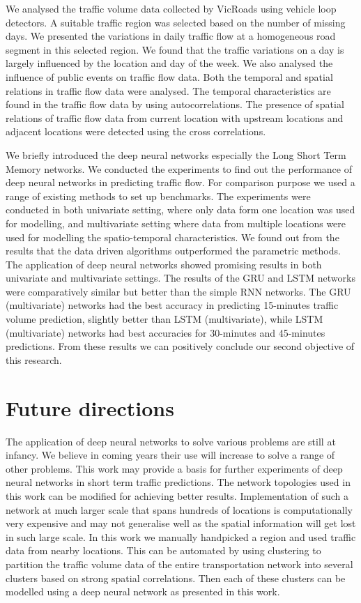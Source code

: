 We analysed the traffic volume data collected by VicRoads using vehicle loop detectors. A suitable
traffic region was selected based on the number of missing days. We presented the
variations in daily traffic flow at a homogeneous road segment in this selected region. We found
that the traffic variations on a day is largely influenced by the location and day of the week.
We also analysed the influence of public events on traffic flow data. Both the temporal and
spatial relations in traffic flow data were analysed. The temporal characteristics are found in the
traffic flow data by using autocorrelations. The presence of spatial relations of traffic flow
data from current location with upstream locations and adjacent locations were detected using the
cross correlations.

We briefly introduced the deep neural networks especially the Long Short Term Memory networks.
We conducted the experiments to find out the performance of deep neural networks in predicting traffic
flow. For comparison purpose we used a range of existing methods to set up benchmarks. The experiments
were conducted in both univariate setting, where only data form one location was used for modelling, and
multivariate setting where data from multiple locations were used for modelling the spatio-temporal
characteristics. We found out from the results that the data driven algorithms outperformed the parametric
methods. The application of deep neural networks showed promising results in both univariate and
multivariate settings. The results of the GRU and LSTM networks were comparatively similar but better
than the simple RNN networks. The GRU (multivariate) networks had the best accuracy in predicting 15-minutes traffic
volume prediction, slightly better than LSTM (multivariate), while LSTM (multivariate) networks had
best accuracies for 30-minutes and 45-minutes predictions. From these results we can positively
conclude our second objective of this research.

\section{Future directions}
The application of deep neural networks to solve various problems are still at infancy. We believe in
coming years their use will increase to solve a range of other problems. This work may provide a basis
for further experiments of deep neural networks in short term traffic predictions. The network topologies
used in this work can be modified for achieving better results. Implementation of such a network at much
larger scale that spans hundreds of locations is computationally very expensive and may not generalise
well as the spatial information will get lost in such large scale. In this work we manually handpicked
a region and used traffic data from nearby locations. This can be automated by using clustering
to partition the traffic volume data of the entire transportation network into several clusters
based on strong spatial correlations. Then each of these clusters can be modelled using a deep
neural network as presented in this work.
